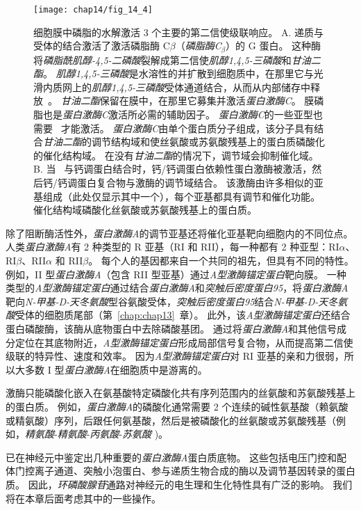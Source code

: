 \begin{figure}[htbp]
	\centering
	\texttt{[image: chap14/fig\_14\_4]}
	\caption{细胞膜中磷脂的水解激活 3 个主要的第二信使级联响应。
		A. 递质与受体的结合激活了激活磷脂酶 C$\beta$（\textit{磷脂酶C}$_\beta$）的 G 蛋白。
		这种酶将\textit{磷脂酰肌醇-4,5-二磷酸}裂解成第二信使\textit{肌醇1,4,5-三磷酸}和\textit{甘油二酯}。
		\textit{肌醇1,4,5-三磷酸}是水溶性的并扩散到细胞质中，在那里它与光滑内质网上的\textit{肌醇1,4,5-三磷酸}受体通道结合，从而从内部储存中释放~。
		\textit{甘油二酯}保留在膜中，在那里它募集并激活\textit{蛋白激酶C}。
		膜磷脂也是\textit{蛋白激酶C}激活所必需的辅助因子。
		\textit{蛋白激酶C}的一些亚型也需要~ 才能激活。
		\textit{蛋白激酶C}由单个蛋白质分子组成，该分子具有结合\textit{甘油二酯}的调节结构域和使丝氨酸或苏氨酸残基上的蛋白质磷酸化的催化结构域。
		在没有\textit{甘油二酯}的情况下，调节域会抑制催化域。
		B. 当~ 与钙调蛋白结合时，钙/钙调蛋白依赖性蛋白激酶被激活，然后钙/钙调蛋白复合物与激酶的调节域结合。
		该激酶由许多相似的亚基组成（此处仅显示其中一个），每个亚基都具有调节和催化功能。
		催化结构域磷酸化丝氨酸或苏氨酸残基上的蛋白质。}
	\label{fig:14_4}
\end{figure}


除了阻断酶活性外，\textit{蛋白激酶A}的调节亚基还将催化亚基靶向细胞内的不同位点。
人类\textit{蛋白激酶A}有 2 种类型的 R 亚基（RI 和 RII），每一种都有 2 种亚型：RI$\alpha$、RI$\beta$、RII$\alpha$ 和 RII$\beta$。
每个人的基因都来自一个共同的祖先，但具有不同的特性。
例如，II 型\textit{蛋白激酶A}（包含 RII 型亚基）通过\textit{A型激酶锚定蛋白}靶向膜。
一种类型的\textit{A型激酶锚定蛋白}通过结合\textit{蛋白激酶A}和\textit{突触后密度蛋白95}，将\textit{蛋白激酶A}靶向\textit{N-甲基-D-天冬氨酸}型谷氨酸受体，\textit{突触后密度蛋白95}结合\textit{N-甲基-D-天冬氨酸}受体的细胞质尾部（第~\ref{chap:chap13}~章）。
此外，该\textit{A型激酶锚定蛋白}还结合蛋白磷酸酶，该酶从底物蛋白中去除磷酸基团。
通过将\textit{蛋白激酶A}和其他信号成分定位在其底物附近，\textit{A型激酶锚定蛋白}形成局部信号复合物，从而提高第二信使级联的特异性、速度和效率。
因为\textit{A型激酶锚定蛋白}对 RI 亚基的亲和力很弱，所以大多数 I 型\textit{蛋白激酶A}在细胞质中是游离的。


激酶只能磷酸化嵌入在氨基酸特定磷酸化共有序列范围内的丝氨酸和苏氨酸残基上的蛋白质。
例如，\textit{蛋白激酶A}的磷酸化通常需要 2 个连续的碱性氨基酸（赖氨酸或精氨酸）序列，后跟任何氨基酸，然后是被磷酸化的丝氨酸或苏氨酸残基（例如，\textit{精氨酸}-\textit{精氨酸}-\textit{丙氨酸}-\textit{苏氨酸} )。


已在神经元中鉴定出几种重要的\textit{蛋白激酶A}蛋白质底物。
这些包括电压门控和配体门控离子通道、突触小泡蛋白、参与递质生物合成的酶以及调节基因转录的蛋白质。
因此，\textit{环磷酸腺苷}通路对神经元的电生理和生化特性具有广泛的影响。
我们将在本章后面考虑其中的一些操作。



